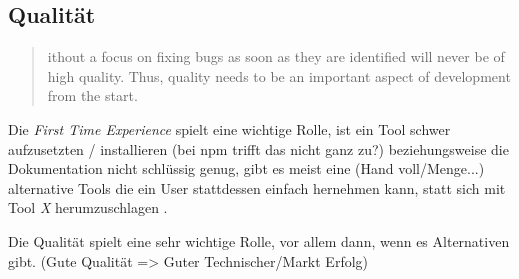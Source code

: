 \subsection{Qualität}

\rawidea




\begin{quote}
    \begin{tcolorbox}[colback=black!5!white,colframe=white!75!black,title=Direkt Zitat aus \cite{bangerthWhatMakesComputational2013} Kapitel 2.1]
        [W]ithout a focus on fixing bugs as soon as they are
        identified will never be of high quality.
        Thus, quality needs to be an important aspect of
        development from the start.
    \end{tcolorbox}
\end{quote}

Die \textit{First Time Experience} spielt eine wichtige Rolle, ist ein Tool
schwer aufzusetzten / installieren (bei npm trifft das nicht ganz zu?)
beziehungsweise die Dokumentation nicht schlüssig genug, gibt es meist eine (Hand voll/Menge...) alternative Tools
die ein User stattdessen einfach hernehmen kann, statt sich mit Tool \textit{X} herumzuschlagen
\cite{bangerthWhatMakesComputational2013}. %

\begin{hypothesis}
    Die Qualität spielt eine sehr wichtige Rolle, vor allem dann, wenn es Alternativen gibt. 
    (Gute Qualität => Guter Technischer/Markt Erfolg) 
\end{hypothesis}